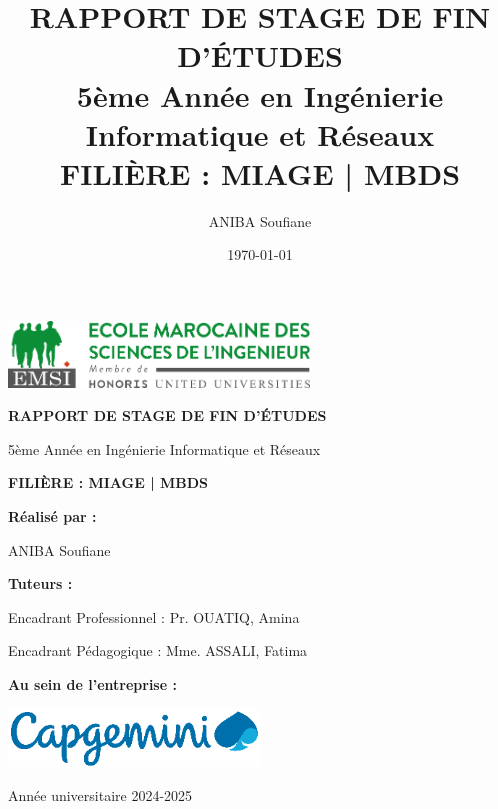 \documentclass[12pt,a4paper,twoside]{report}
\title{\textbf{RAPPORT DE STAGE DE FIN D'ÉTUDES} \\
       \large{5ème Année en Ingénierie Informatique et Réseaux} \\
       \vspace{0.5cm}
       \textbf{FILIÈRE : MIAGE | MBDS}}
\author{ANIBA Soufiane}
\date{\today}
\begin{document}
\begin{titlepage}
    \centering

    \includegraphics[width=0.6\textwidth]{latex_media/media/image1.png}

    \vspace{1cm}

    {\huge\bfseries RAPPORT DE STAGE DE FIN D'ÉTUDES \par}

    \vspace{0.5cm}
    {\Large 5ème Année en Ingénierie Informatique et Réseaux \par}

    \vspace{0.5cm}
    {\Large\bfseries FILIÈRE : MIAGE | MBDS \par}

    \vspace{2cm}

    {\Large\textbf{Réalisé par :} \par}
    \vspace{0.3cm}
    {\Large ANIBA Soufiane \par}

    \vspace{2cm}

    {\Large\textbf{Tuteurs :} \par}
    \vspace{0.3cm}
    {\large Encadrant Professionnel : Pr. OUATIQ, Amina \par}
    \vspace{0.2cm}
    {\large Encadrant Pédagogique : Mme. ASSALI, Fatima \par}

    {\Large\textbf{Au sein de l'entreprise :} \par}
    \vspace{0.2cm}
    \includegraphics[width=0.5\textwidth]{latex_media/media/image2.png}

    \vfill

    {\large Année universitaire 2024-2025 \par}
\end{titlepage}
\end{document}
